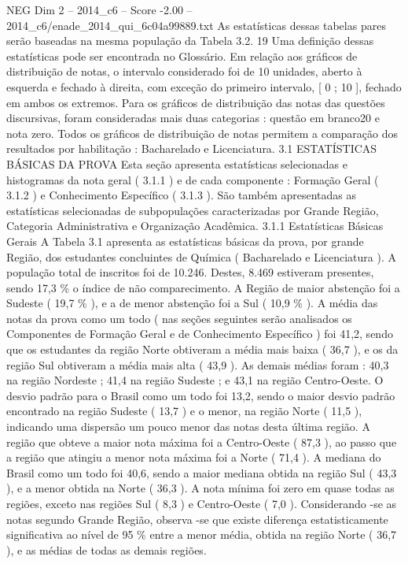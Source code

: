 \begin{textsample}{NEG Dim 2 – 2014\_c6 – Score -2.00 – 2014\_c6/enade\_2014\_qui\_6c04a99889.txt}
As estatísticas dessas tabelas pares serão baseadas na mesma população da Tabela 3.2. 19 Uma definição dessas estatísticas pode ser encontrada no Glossário.
Em relação aos gráficos de distribuição de notas, o intervalo considerado foi de 10 unidades, aberto à esquerda e fechado à direita, com exceção do primeiro intervalo, [ 0 ; 10 ], fechado em ambos os extremos.
Para os gráficos de distribuição das notas das questões discursivas, foram consideradas mais duas categorias : questão em branco20 e nota zero.
Todos os gráficos de distribuição de notas permitem a comparação dos resultados por habilitação : Bacharelado e Licenciatura. 3.1 ESTATÍSTICAS BÁSICAS DA PROVA Esta seção apresenta estatísticas selecionadas e histogramas da nota geral ( 3.1.1 ) e de cada componente : Formação Geral ( 3.1.2 ) e Conhecimento Específico ( 3.1.3 ).
São também apresentadas as estatísticas selecionadas de subpopulações caracterizadas por Grande Região, Categoria Administrativa e Organização Acadêmica. 3.1.1 Estatísticas Básicas Gerais A Tabela 3.1 apresenta as estatísticas básicas da prova, por grande Região, dos estudantes concluintes de Química ( Bacharelado e Licenciatura ).
A população total de inscritos foi de 10.246.
Destes, 8.469 estiveram presentes, sendo 17,3 \% o índice de não comparecimento.
A Região de maior abstenção foi a Sudeste ( 19,7 \% ), e a de menor abstenção foi a Sul ( 10,9 \% ).
A média das notas da prova como um todo ( nas seções seguintes serão analisados os Componentes de Formação Geral e de Conhecimento Específico ) foi 41,2, sendo que os estudantes da região Norte obtiveram a média mais baixa ( 36,7 ), e os da região Sul obtiveram a média mais alta ( 43,9 ).
As demais médias foram : 40,3 na região Nordeste ; 41,4 na região Sudeste ; e 43,1 na região Centro-Oeste.
O desvio padrão para o Brasil como um todo foi 13,2, sendo o maior desvio padrão encontrado na região Sudeste ( 13,7 ) e o menor, na região Norte ( 11,5 ), indicando uma dispersão um pouco menor das notas desta última região.
A região que obteve a maior nota máxima foi a Centro-Oeste ( 87,3 ), ao passo que a região que atingiu a menor nota máxima foi a Norte ( 71,4 ).
A mediana do Brasil como um todo foi 40,6, sendo a maior mediana obtida na região Sul ( 43,3 ), e a menor obtida na Norte ( 36,3 ).
A nota mínima foi zero em quase todas as regiões, exceto nas regiões Sul ( 8,3 ) e Centro-Oeste ( 7,0 ).
Considerando -se as notas segundo Grande Região, observa -se que existe diferença estatisticamente significativa ao nível de 95 \% entre a menor média, obtida na região Norte ( 36,7 ), e as médias de todas as demais regiões.

\end{textsample}
